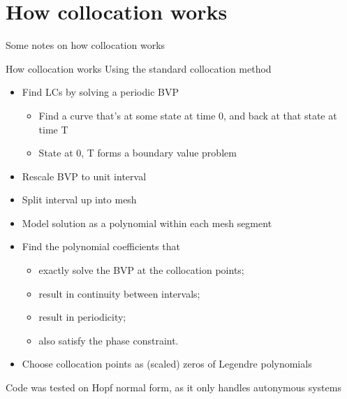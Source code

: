 \documentclass[presentation]{beamer}
\begin{document}
\section{How collocation works}
\label{sec:org71e93c2}
\begin{frame}[label={sec:orgf398067}]{}
\begin{center}
Some notes on how collocation works
\end{center}
\end{frame}

\begin{frame}[label={sec:orgee077bd},plain]{How collocation works}
Using the standard collocation method
\begin{itemize}
\item Find LCs by solving a periodic BVP
\begin{itemize}
\item Find a curve that's at some state at time 0, and back at that state at time T
\item State at 0, T forms a boundary value problem
\end{itemize}
\item Rescale BVP to unit interval
\item Split interval up into mesh
\item Model solution as a polynomial within each mesh segment
\item Find the polynomial coefficients that
\begin{itemize}
\item exactly solve the BVP at the collocation points;
\item result in continuity between intervals;
\item result in periodicity;
\item also satisfy the phase constraint.
\end{itemize}
\item Choose collocation points as (scaled) zeros of Legendre polynomials
\end{itemize}

Code was tested on Hopf normal form, as it only handles autonymous systems
\end{frame}
\end{document}
